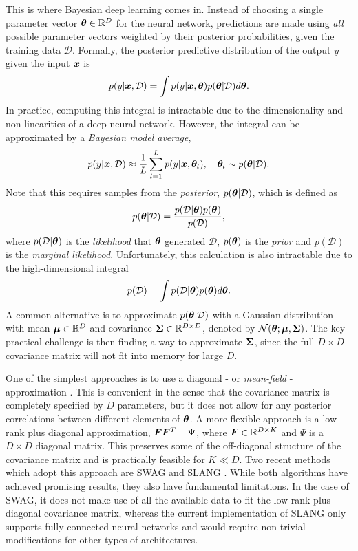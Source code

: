\documentclass[10pt]{article} %
\begin{document}
This is where Bayesian deep learning comes in. Instead of choosing a single parameter vector ${\bm{\theta}} \in \mathbb{R}^D$ for the neural network, predictions are made using \emph{all} possible parameter vectors weighted by their posterior probabilities, given the training data $\mathcal{D}$. Formally, the posterior predictive distribution of the output $y$ given the input ${\bm{x}}$ is
\begin{equation}
	p(y | {\bm{x}}, \mathcal{D}) = \int p(y | {\bm{x}}, {\bm{\theta}}) p({\bm{\theta}} | \mathcal{D}) d{\bm{\theta}}.
\end{equation}
In practice, computing this integral is intractable due to the dimensionality and non-linearities of a deep neural network. However, the integral can be approximated by a \emph{Bayesian model average},
\begin{equation}
	p(y | {\bm{x}}, \mathcal{D}) \approx \frac{1}{L} \sum_{l=1}^L p(y | {\bm{x}}, {\bm{\theta}}_l), 
	\quad {\bm{\theta}}_l \sim p({\bm{\theta}} | \mathcal{D}).
\end{equation}
Note that this requires samples from the \emph{posterior}, $p({\bm{\theta}} | \mathcal{D})$, which is defined as
\begin{equation}
	p({\bm{\theta}} | \mathcal{D}) = \frac{p(\mathcal{D} | {\bm{\theta}}) p({\bm{\theta}})}{p(\mathcal{D})},
\end{equation}
where $p(\mathcal{D} | {\bm{\theta}})$ is the \emph{likelihood} that ${\bm{\theta}}$ generated $\mathcal{D}$, $p({\bm{\theta}})$ is the \emph{prior} and $p(\mathcal{D})$ is the \emph{marginal likelihood}. Unfortunately, this calculation is also intractable due to the high-dimensional integral \begin{equation}
	p(\mathcal{D}) = \int p(\mathcal{D} | {\bm{\theta}}) p({\bm{\theta}}) d{\bm{\theta}}.
\end{equation}
A common alternative is to approximate $p({\bm{\theta}} | \mathcal{D})$ with a Gaussian distribution with mean ${\bm{\mu}} \in \mathbb{R}^D$ and covariance ${\bm{\Sigma}} \in \mathbb{R}^{D\times D}$, denoted by $\mathcal{N}({\bm{\theta}}; {\bm{\mu}}, {\bm{\Sigma}})$. The key practical challenge is then finding a way to approximate ${\bm{\Sigma}}$, since the full $D\times D$ covariance matrix will not fit into memory for large $D$. 

One of the simplest approaches is to use a diagonal - or \emph{mean-field} - approximation \citep{blundell2015, graves2011, hernandez2015, tangkaratt2018, ranganath2014}. This is convenient in the sense that the covariance matrix is completely specified by $D$ parameters, but it does not allow for any posterior correlations between different elements of ${\bm{\theta}}$. A more flexible approach is a low-rank plus diagonal approximation, ${\bm{F}} {\bm{F}}^T + \Psi$, where ${\bm{F}} \in \mathbb{R}^{D\times K}$ and $\Psi$ is a $D \times D$ diagonal matrix. This preserves some of the off-diagonal structure of the covariance matrix and is practically feasible for $K \ll D$. Two recent methods which adopt this approach are SWAG \citep{maddox2019} and SLANG \citep{mishkin2018}. While both algorithms have achieved promising results, they also have fundamental limitations. In the case of SWAG, it does not make use of all the available data to fit the low-rank plus diagonal covariance matrix, whereas the current implementation of SLANG only supports fully-connected neural networks and would require non-trivial modifications for other types of architectures.
\end{document}
